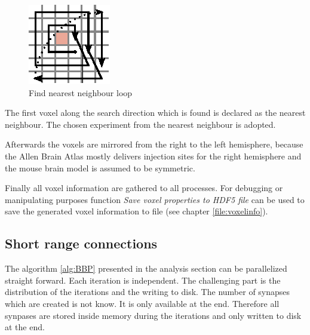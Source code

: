 \begin{figure}[ht!]
\centering
\includegraphics[scale=2.5]{pictures/longRange_Nearest_parallelAlg.eps}
\caption{Find nearest neighbour loop}
\label{longrange}
\end{figure}
The first voxel along the search direction which is found is declared as the nearest neighbour.
The chosen experiment from the nearest neighbour is adopted.

Afterwards the voxels are mirrored from the right to the left hemisphere, because the
Allen Brain Atlas mostly delivers injection sites for the right hemisphere and
the mouse brain model is assumed to be symmetric.

Finally all voxel information are gathered to all processes.
For debugging or manipulating purposes function \emph{Save voxel properties to HDF5 file} can be used
to save the generated voxel information to file (see chapter \ref{file:voxelinfo}).



\subsection{Short range connections}

The algorithm \ref{alg:BBP} presented in the analysis section can be parallelized straight forward.
Each iteration is independent. The challenging part is the distribution of the iterations and
the writing to disk. The number of synapses which are created is not know. It is only available
at the end. Therefore all synpases are stored inside memory during the iterations and only written to disk 
at the end.

